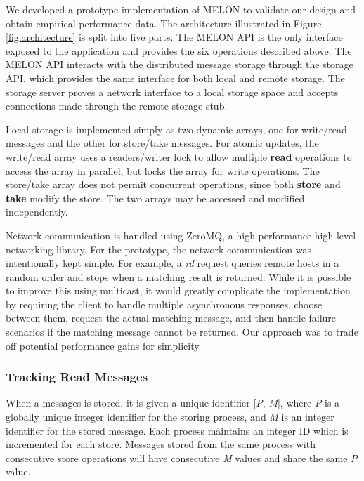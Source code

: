 \documentclass[lnicst]{svmultln}
\begin{document}
We developed a prototype implementation of MELON to validate our design and obtain empirical performance data. The architecture illustrated in Figure \ref{fig:architecture} is split into five parts. The MELON API is the only interface exposed to the application and provides the six operations described above. The MELON API interacts with the distributed message storage through the storage API, which provides the same interface for both local and remote storage. The storage server proves a network interface to a local storage space and accepts connections made through the remote storage stub.

Local storage is implemented simply as two dynamic arrays, one for write/read messages and the other for store/take messages. For atomic updates, the write/read array uses a readers/writer lock to allow multiple \textbf{read} operations to access the array in parallel, but locks the array for write operations. The store/take array does not permit concurrent operations, since both \textbf{store} and \textbf{take} modify the store. The two arrays may be accessed and modified independently.

Network communication is handled using ZeroMQ\cite{hintjens2013zeromq}, a high performance high level networking library. For the prototype, the network communication was intentionally kept simple. For example, a \textit{rd} request queries remote hosts in a random order and stops when a matching result is returned. While it is possible to improve this using multicast, it would greatly complicate the implementation by requiring the client to handle multiple asynchronous responses, choose between them, request the actual matching message, and then handle failure scenarios if the matching message cannot be returned. Our approach was to trade off potential performance gains for simplicity. 

\subsubsection{Tracking Read Messages}\label{sec:readmessages}

    When a messages is stored, it is given a unique identifier [\textit{P}, \textit{M}], where \textit{P} is a globally unique integer identifier for the storing process, and \textit{M} is an integer identifier for the stored message. Each process maintains an integer ID which is incremented for each store. Messages stored from the same process with consecutive store operations will have consecutive \textit{M} values and share the same \textit{P} value.
\end{document}
